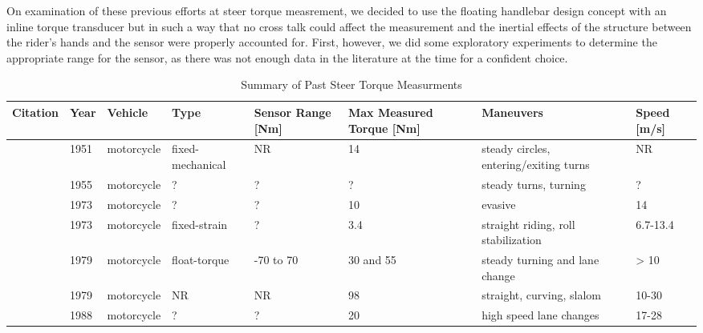 \documentclass[10pt]{article}
\begin{document}

On examination of these previous efforts at steer torque measrement, we decided
to use the floating handlebar design concept with an inline torque transducer
but in such a way that no cross talk could affect the measurement and the
inertial effects of the structure between the rider's hands and the sensor were
properly accounted for. First, however, we did some exploratory experiments to
determine the appropriate range for the sensor, as there was not enough data in
the literature at the time for a confident choice.

\begin{landscape}
\begin{table}
  \caption{Summary of Past Steer Torque Measurments}
  \small
  \begin{tabular}{llllllll}
    \toprule
    Citation                              &  Year &     Vehicle &              Type & Sensor Range [Nm] & Max Measured Torque [Nm] &                               Maneuvers & Speed [m/s] \\
    \midrule
    \cite{Wilson-Jones1951}               &  1951 &  motorcycle &  fixed-mechanical &                NR &                       14 &  steady circles, entering/exiting turns &          NR \\
    \cite{Kondo1955}                      &  1955 &  motorcycle &                 ? &                 ? &                        ? &                   steady turns, turning &           ? \\
    \cite{Watanabe1973}                   &  1973 &  motorcycle &                 ? &                 ? &                       10 &                                 evasive &          14 \\
    \cite{Eaton1973}                      &  1973 &  motorcycle &      fixed-strain &                 ? &                      3.4 &     straight riding, roll stabilization &    6.7-13.4 \\
    \cite{Weir1979a}                      &  1979 &  motorcycle &      float-torque &         -70 to 70 &                30 and 55 &          steady turning and lane change &        > 10 \\
    \cite{Aoki1979}                       &  1979 &  motorcycle &                NR &                NR &                       98 &               straight, curving, slalom &       10-30 \\
    \cite{Sugizaki1988}                   &  1988 &  motorcycle &                 ? &                 ? &                       20 &                 high speed lane changes &       17-28 \\

\end{tabular}
\end{table}
\end{landscape}
\end{document}
